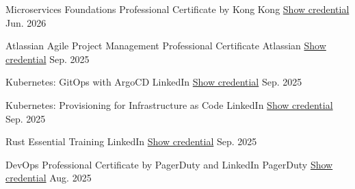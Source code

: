 

\begin{cvhonors}

  \cvhonor
    {Microservices Foundations Professional Certificate by Kong} %
    {Kong} %
    {\href{https://www.linkedin.com/learning/certificates/87db4feb44b37663220b4d1e1956ae7536fe37e5dff787c1e41b99f8970ae3e0}{Show credential}} %
    {Jun. 2026} %

  \cvhonor
    {Atlassian Agile Project Management Professional Certificate} %
    {Atlassian} %
    {\href{https://www.linkedin.com/learning/certificates/0d48094891b143075f223e87103aa01e08f4e6af7cde0c4985d8fe017783844f}{Show credential}} %
    {Sep. 2025} %

  \cvhonor
    {Kubernetes: GitOps with ArgoCD} %
    {LinkedIn} %
    {\href{https://www.linkedin.com/learning/certificates/4157d21f29390904aefa819ba1054a30b1a79632292d4c0925bdd121f73546e8}{Show credential}} %
    {Sep. 2025} %

  \cvhonor
    {Kubernetes: Provisioning for Infrastructure as Code} %
    {LinkedIn} %
    {\href{https://www.linkedin.com/learning/certificates/0273b7815f6b1879a23317b78466931e7269b531677673269cb92624e9c2aebe}{Show credential}} %
    {Sep. 2025} %

  \cvhonor
    {Rust Essential Training} %
    {LinkedIn} %
    {\href{https://www.linkedin.com/learning/certificates/49cb03f14554b65c2c72e832b7287cc70014e3b070c065278df550864b5594f3}{Show credential}} %
    {Sep. 2025} %

  \cvhonor
    {DevOps Professional Certificate by PagerDuty and LinkedIn} %
    {PagerDuty} %
    {\href{https://www.linkedin.com/learning/certificates/2e76b31de78072b0309f48df42c7c7537f79cf82af3ff49aa300b8a5c598773a}{Show credential}} %
    {Aug. 2025} %


\end{cvhonors}
